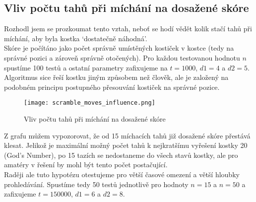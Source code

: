 \documentclass{article}
\begin{document}
\subsection*{Vliv počtu tahů při míchání na dosažené skóre}
Rozhodl jsem se prozkoumat tento vztah, neboť se hodí vědět kolik stačí tahů při míchání, aby byla kostka
`dostatečně náhodná'. \\
Skóre je počítáno jako počet správně umístěných kostiček v kostce (tedy na správné pozici a zároveň správně otočených).
Pro každou testovanou hodnotu $n$ spustíme 100 testů a ostatní parametry zafixujeme na
$t = 1000$, $d1 = 4$ a $d2 = 5$.\\
Algoritmus sice řeší kostku jiným způsobem než člověk, ale je založený na podobném principu 
postupného přesouvání kostiček na správné pozice.

\begin{figure}[h]
    \centering
    \texttt{[image: scramble\_moves\_influence.png]}
    \caption{Vliv počtu tahů při míchání na dosažené skóre}
    \label{fig:scramble_moves_influence}
\end{figure}

Z grafu můžem vypozorovat, že od 15 míchacích tahů již dosažené skóre přestává klesat. 
Jelikož je maximální možný počet tahů k nejkratšímu vyřešení kostky 20 (God's Number),
po 15 tazích se nedostaneme do všech stavů kostky, ale pro amatéry v řešení by mohl být tento počet
postačující.\\
Raději ale tuto hypotézu otestujeme pro větší časové omezení a větší hloubky prohledávání.
Spustíme tedy 50 testů jednotlivě pro hodnoty $n = 15$ a $n = 50$ a zafixujeme $t = 150000$, $d1 = 6$ a $d2 = 8$.
\end{document}
